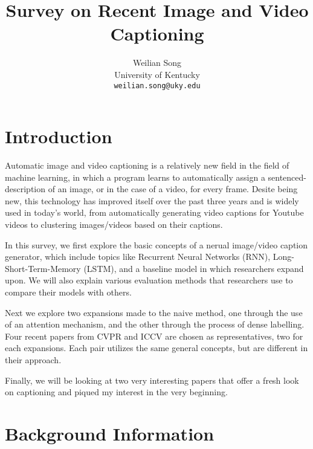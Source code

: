 \documentclass[10pt,twocolumn,letterpaper]{article}
\begin{document}
\title{Survey on Recent Image and Video Captioning}

\author{Weilian Song\\
University of Kentucky\\
{\tt\small weilian.song@uky.edu}
}

\maketitle

\section{Introduction}

Automatic image and video captioning is a relatively new field in the field of
machine learning, in which a program learns to automatically assign a
sentenced-description of an image, or in the case of a video, for every frame.
Desite being new, this technology has improved itself over the past three
years and is widely used in today's world, from automatically generating video
captions for Youtube videos to clustering images/videos based on their
captions.

In this survey, we first explore the basic concepts of a nerual image/video
caption generator, which include topics like Recurrent Neural Networks (RNN),
Long-Short-Term-Memory (LSTM), and a baseline model in which researchers
expand upon. We will also explain various evaluation methods that researchers
use to compare their models with others.

Next we explore two expansions made to the naive method, one through the use
of an attention mechanism, and the other through the process of dense
labelling. Four recent papers from CVPR and ICCV are chosen as
representatives, two for each expansions. Each pair utilizes the same general
concepts, but are different in their approach.

Finally, we will be looking at two very interesting papers that offer a fresh
look on captioning and piqued my interest in the very beginning.

\section{Background Information}
\end{document}
